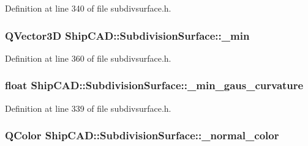 Definition at line 340 of file subdivsurface.\-h.

\hypertarget{classShipCAD_1_1SubdivisionSurface_ae1d7164e7bdcebc2584a54f466495053}{
\subsubsection[{\-\_\-min}]{\setlength{\rightskip}{0pt plus 5cm}Q\-Vector3\-D Ship\-C\-A\-D\-::\-Subdivision\-Surface\-::\-\_\-min\hspace{0.3cm}{\ttfamily [protected]}}}\label{classShipCAD_1_1SubdivisionSurface_ae1d7164e7bdcebc2584a54f466495053}


Definition at line 360 of file subdivsurface.\-h.

\hypertarget{classShipCAD_1_1SubdivisionSurface_ac343c30f7e4e6a5926fdfed7da3f9385}{
\subsubsection[{\-\_\-min\-\_\-gaus\-\_\-curvature}]{\setlength{\rightskip}{0pt plus 5cm}float Ship\-C\-A\-D\-::\-Subdivision\-Surface\-::\-\_\-min\-\_\-gaus\-\_\-curvature\hspace{0.3cm}{\ttfamily [protected]}}}\label{classShipCAD_1_1SubdivisionSurface_ac343c30f7e4e6a5926fdfed7da3f9385}


Definition at line 339 of file subdivsurface.\-h.

\hypertarget{classShipCAD_1_1SubdivisionSurface_a62cbe24451a794c0da3660ed0f1066ca}{
\subsubsection[{\-\_\-normal\-\_\-color}]{\setlength{\rightskip}{0pt plus 5cm}Q\-Color Ship\-C\-A\-D\-::\-Subdivision\-Surface\-::\-\_\-normal\-\_\-color\hspace{0.3cm}{\ttfamily [protected]}}}\label{classShipCAD_1_1SubdivisionSurface_a62cbe24451a794c0da3660ed0f1066ca}


